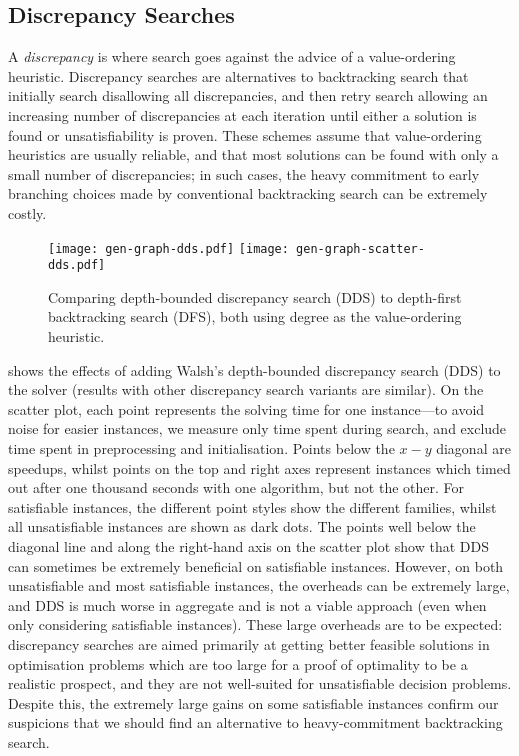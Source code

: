 \documentclass[runningheads]{llncs}
\begin{document}
\subsection{Discrepancy Searches}

A \emph{discrepancy} is where search goes against the advice of a value-ordering heuristic.
Discrepancy searches
\cite{DBLP:conf/ijcai/HarveyG95,DBLP:conf/aaai/Korf96,DBLP:conf/ijcai/Walsh97,DBLP:conf/cpaior/KarouiHLN07}
are alternatives to backtracking search that initially search disallowing all discrepancies, and
then retry search allowing an increasing number of discrepancies at each iteration until either a
solution is found or unsatisfiability is proven. These schemes assume that value-ordering heuristics
are usually reliable, and that most solutions can be found with only a small number of
discrepancies; in such cases, the heavy commitment to early branching choices made by conventional
backtracking search can be extremely costly.

\begin{figure}[tb]
    \texttt{[image: gen-graph-dds.pdf]}
    \hfill
    \texttt{[image: gen-graph-scatter-dds.pdf]}

    \caption{Comparing depth-bounded discrepancy search (DDS) to depth-first backtracking search
    (DFS), both using degree as the value-ordering heuristic.}\label{figure:scatter-dds}
\end{figure}

 shows the effects of adding Walsh's \cite{DBLP:conf/ijcai/Walsh97}
depth-bounded discrepancy search (DDS) to the solver (results with other discrepancy search variants
are similar). On the scatter plot, each point represents the solving time for one instance---to
avoid noise for easier instances, we measure only time spent during search, and exclude time spent
in preprocessing and initialisation.  Points below the $x-y$ diagonal are speedups, whilst points on
the top and right axes represent instances which timed out after one thousand seconds with one
algorithm, but not the other. For satisfiable instances, the different point styles show the
different families, whilst all unsatisfiable instances are shown as dark dots.  The points well
below the diagonal line and along the right-hand axis on the scatter plot show that DDS can
sometimes be extremely beneficial on satisfiable instances.  However, on both unsatisfiable and most
satisfiable instances, the overheads can be extremely large, and DDS is much worse in aggregate and
is not a viable approach (even when only considering satisfiable instances).  These large overheads
are to be expected: discrepancy searches are aimed primarily at getting better feasible solutions in
optimisation problems which are too large for a proof of optimality to be a realistic prospect, and
they are not well-suited for unsatisfiable decision problems. Despite this, the extremely large
gains on some satisfiable instances confirm our suspicions that we should find an alternative to
heavy-commitment backtracking search.
\end{document}
